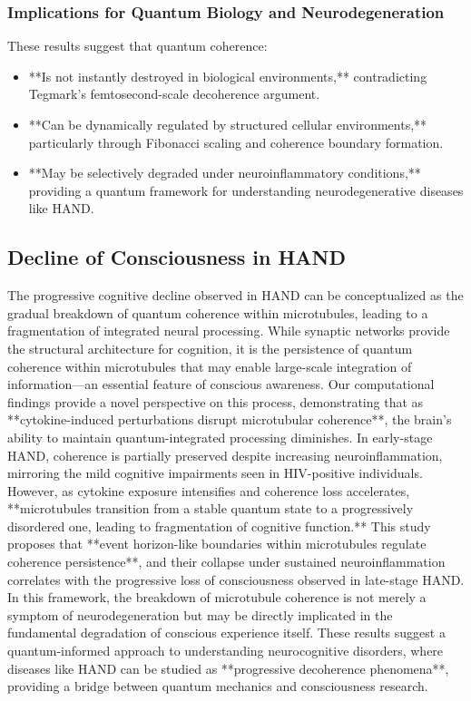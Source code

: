 \subsubsection{Implications for Quantum Biology and Neurodegeneration}
These results suggest that quantum coherence:
\begin{itemize}
    \item **Is not instantly destroyed in biological environments,** contradicting Tegmark’s femtosecond-scale decoherence argument.
    \item **Can be dynamically regulated by structured cellular environments,** particularly through Fibonacci scaling and coherence boundary formation.
    \item **May be selectively degraded under neuroinflammatory conditions,** providing a quantum framework for understanding neurodegenerative diseases like HAND.
\end{itemize}
\subsection{Decline of Consciousness in HAND}
The progressive cognitive decline observed in HAND can be conceptualized as the gradual breakdown of quantum coherence within microtubules, leading to a fragmentation of integrated neural processing. While synaptic networks provide the structural architecture for cognition, it is the persistence of quantum coherence within microtubules that may enable large-scale integration of information—an essential feature of conscious awareness. 
Our computational findings provide a novel perspective on this process, demonstrating that as **cytokine-induced perturbations disrupt microtubular coherence**, the brain’s ability to maintain quantum-integrated processing diminishes. In early-stage HAND, coherence is partially preserved despite increasing neuroinflammation, mirroring the mild cognitive impairments seen in HIV-positive individuals. However, as cytokine exposure intensifies and coherence loss accelerates, **microtubules transition from a stable quantum state to a progressively disordered one, leading to fragmentation of cognitive function.**
This study proposes that **event horizon-like boundaries within microtubules regulate coherence persistence**, and their collapse under sustained neuroinflammation correlates with the progressive loss of consciousness observed in late-stage HAND. In this framework, the breakdown of microtubule coherence is not merely a symptom of neurodegeneration but may be directly implicated in the fundamental degradation of conscious experience itself. 
These results suggest a quantum-informed approach to understanding neurocognitive disorders, where diseases like HAND can be studied as **progressive decoherence phenomena**, providing a bridge between quantum mechanics and consciousness research.